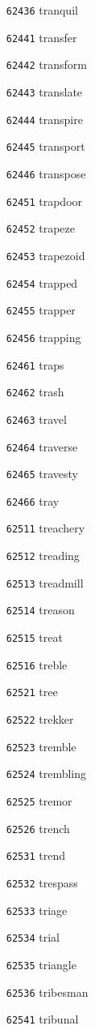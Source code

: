 \documentclass[twoside,11pt]{article}
\begin{document}
\begin{multicols}{5}
\begin{enumerate}
\item[\texttt{62436}] tranquil
\item[\texttt{62441}] transfer
\item[\texttt{62442}] transform
\item[\texttt{62443}] translate
\item[\texttt{62444}] transpire
\item[\texttt{62445}] transport
\item[\texttt{62446}] transpose
\item[\texttt{62451}] trapdoor
\item[\texttt{62452}] trapeze
\item[\texttt{62453}] trapezoid
\item[\texttt{62454}] trapped
\item[\texttt{62455}] trapper
\item[\texttt{62456}] trapping
\item[\texttt{62461}] traps
\item[\texttt{62462}] trash
\item[\texttt{62463}] travel
\item[\texttt{62464}] traverse
\item[\texttt{62465}] travesty
\item[\texttt{62466}] tray
\item[\texttt{62511}] treachery
\item[\texttt{62512}] treading
\item[\texttt{62513}] treadmill
\item[\texttt{62514}] treason
\item[\texttt{62515}] treat
\item[\texttt{62516}] treble
\item[\texttt{62521}] tree
\item[\texttt{62522}] trekker
\item[\texttt{62523}] tremble
\item[\texttt{62524}] trembling
\item[\texttt{62525}] tremor
\item[\texttt{62526}] trench
\item[\texttt{62531}] trend
\item[\texttt{62532}] trespass
\item[\texttt{62533}] triage
\item[\texttt{62534}] trial
\item[\texttt{62535}] triangle
\item[\texttt{62536}] tribesman
\item[\texttt{62541}] tribunal

\end{enumerate}
\end{multicols}
\end{document}
